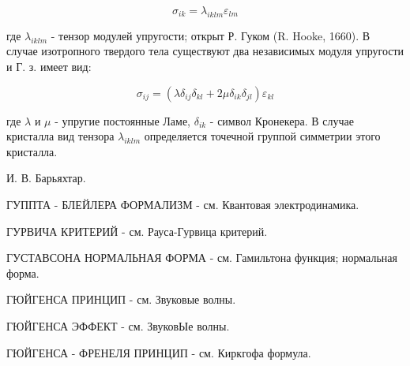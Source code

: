 \documentclass[10pt]{article}
\begin{document}
\[

\sigma_{i k}=\lambda_{i k l m} \varepsilon_{l m}

\]



где $\lambda_{i k l m}$ - тензор модулей упругости; открыт Р. Гуком (R. Hooke, 1660). В случае изотропного твердого тела существуют два независимых модуля упругости и Г. з. имеет вид:



\[

\sigma_{i j}=\left(\lambda \delta_{i j} \delta_{k l}+2 \mu \delta_{i k} \delta_{j l}\right) \varepsilon_{k l}

\]



где $\lambda$ и $\mu$ - упругие постоянные Ламе, $\delta_{i k}$ - символ Кронекера. В случае кристалла вид тензора $\lambda_{i k l m}$ определяется точечной группой симметрии этого кристалла.



И. В. Барьяхтар.



ГУППТА - БЛЕЙЛЕРА ФОРМАЛИЗМ - см. Квантовая электродинамика.



ГУРВИЧА КРИТЕРИЙ - см. Рауса-Гурвица критерий.



ГУСТАВСОНА НОРМАЛЬНАЯ ФОРМА - см. Гамильтона функция; нормальная форма.



ГЮЙГЕНСА ПРИНЦИП - см. Звуковые волны.



ГЮЙГЕНСА ЭФФЕКТ - см. ЗвуковЫе волны.



ГЮЙГЕНСА - ФРЕНЕЛЯ ПРИНЦИП - см. Киркгофа формула.
\end{document}
